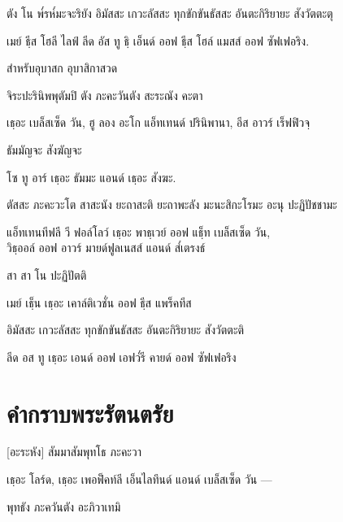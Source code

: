 ตัง โน พ๎รห๎มะจะริยัง อิมัสสะ เกวะลัสสะ ทุกขักขันธัสสะ อันตะกิริยายะ สังวัตตะตุ

\begin{english}
เมย์ ธฺีส โฮลี ไลฟ์ ลีด อัส ทู ธฺิ เอ็นด์ ออฟ ธฺีส โฮล์ แมสส์ ออฟ ซัฟเฟอริง.
\end{english}

\begin{instruction}
สำหรับอุบาสก อุบาสิกาสวด
\end{instruction}

จิระปะรินิพพุตัมปิ ตัง ภะคะวันตัง สะระณัง คะตา

\begin{english}
เธฺอะ เบล็สเซ็ด  วัน, ฮู ลอง อะโก แอ็ทเทนด์ ปรินิพานา, อีส อาวร์ เร็ฟฟิวจฺ
\end{english}

ธัมมัญจะ สังฆัญจะ

\begin{english}
โซ ทู อาร์ เธฺอะ ธัมมะ แอนด์ เธฺอะ สังฆะ.
\end{english}

 ตัสสะ ภะคะวะโต สาสะนัง ยะถาสะติ ยะถาพะลัง มะนะสิกะโรมะ อะนุ ปะฏิปัชชามะ

\begin{english}
แอ็ทเทนทีฟลี วี ฟอล์โลว์ เธฺอะ พาธฺเวย์ ออฟ แธ็ฺท เบล็สเซ็ด วัน,\\
วิธฺออล์ ออฟ อาวร์ มายด์ฟูลเนสส์ แอนด์ ส๎เตรงธ์
\end{english}

สา สา โน ปะฏิปัตติ

\begin{english}
เมย์ เธ็ฺน เธฺอะ เคาล์ติเวชั่น ออฟ ธีฺส แพร็คทีส
\end{english}

อิมัสสะ เกวะลัสสะ ทุกขักขันธัสสะ อันตะกิริยายะ สังวัตตะติ

\begin{english}
ลีด อส ทู เธฺอะ เอนด์ ออฟ เอฟว๎รี คายด์ ออฟ ซัฟเฟอริง
\end{english}

\chapter{คำกราบพระรัตนตรัย}

[อะระหัง] สัมมาสัมพุทโธ ภะคะวา

\begin{english}
เธฺอะ โลร์ด, เธฺอะ เพอฟ็คท์ลี เอ็นไลทึนด์ แอนด์ เบล็สเซ็ด วัน —
\end{english}

พุทธัง ภะควันตัง อะภิวาเทมิ

